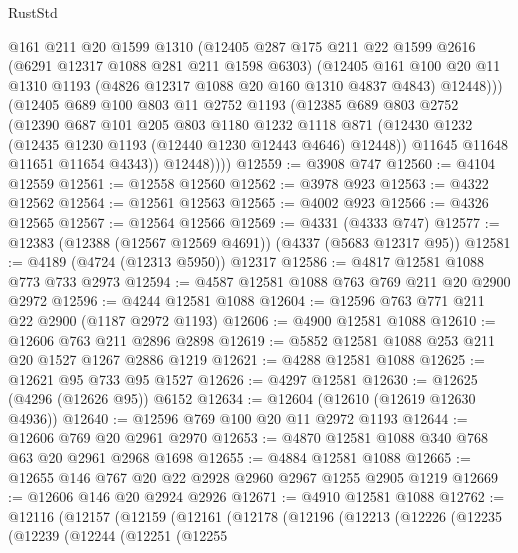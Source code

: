 \begin{lexlean}{RustStd}
\begin{coremodule}
            @161
            @211
            @20
            @1599
            @1310
            (@12405
              @287
              @175
              @211
              @22
              @1599
              @2616
              (@6291 @12317 @1088 @281 @211 @1598 @6303)
              (@12405
                @161
                @100
                @20
                @11
                @1310
                @1193
                (@4826 @12317 @1088 @20 @160 @1310 @4837 @4843)
                @12448)))
          (@12405
            @689
            @100
            @803
            @11
            @2752
            @1193
            (@12385
              @689
              @803
              @2752
              (@12390
                @687
                @101
                @205
                @803
                @1180
                @1232
                @1118
                @871
                (@12430 @1232 (@12435 @1230 @1193 (@12440 @1230 @12443 @4646) @12448))
                @11645
                @11648
                @11651
                @11654
                @4343))
            @12448))))
@12559 := @3908 @747
@12560 := @4104 @12559
@12561 := @12558 @12560
@12562 := @3978 @923
@12563 := @4322 @12562
@12564 := @12561 @12563
@12565 := @4002 @923
@12566 := @4326 @12565
@12567 := @12564 @12566
@12569 := @4331 (@4333 @747)
@12577 := @12383 (@12388 (@12567 @12569 @4691)) (@4337 (@5683 @12317 @95))
@12581 := @4189 (@4724 (@12313 @5950)) @12317
@12586 := @4817 @12581 @1088 @773 @733 @2973
@12594 := @4587 @12581 @1088 @763 @769 @211 @20 @2900 @2972
@12596 := @4244 @12581 @1088
@12604 := @12596 @763 @771 @211 @22 @2900 (@1187 @2972 @1193)
@12606 := @4900 @12581 @1088
@12610 := @12606 @763 @211 @2896 @2898
@12619 := @5852 @12581 @1088 @253 @211 @20 @1527 @1267 @2886 @1219
@12621 := @4288 @12581 @1088
@12625 := @12621 @95 @733 @95 @1527
@12626 := @4297 @12581
@12630 := @12625 (@4296 (@12626 @95)) @6152
@12634 := @12604 (@12610 (@12619 @12630 @4936))
@12640 := @12596 @769 @100 @20 @11 @2972 @1193
@12644 := @12606 @769 @20 @2961 @2970
@12653 := @4870 @12581 @1088 @340 @768 @63 @20 @2961 @2968 @1698
@12655 := @4884 @12581 @1088
@12665 := @12655 @146 @767 @20 @22 @2928 @2960 @2967 @1255 @2905 @1219
@12669 := @12606 @146 @20 @2924 @2926
@12671 := @4910 @12581 @1088
@12762 := @12116
    (@12157
      (@12159
        (@12161
          (@12178
            (@12196
              (@12213
                (@12226
                  (@12235
                    (@12239
                      (@12244
                        (@12251
                          (@12255

\end{coremodule}
\end{lexlean}
